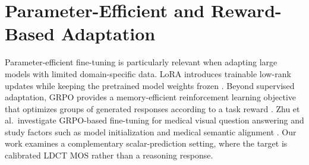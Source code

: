 \section{Parameter-Efficient and Reward-Based Adaptation}
Parameter-efficient fine-tuning is particularly relevant when adapting large models with limited domain-specific data. LoRA introduces trainable low-rank updates while keeping the pretrained model weights frozen \cite{hu2022lora}. Beyond supervised adaptation, GRPO provides a memory-efficient reinforcement learning objective that optimizes groups of generated responses according to a task reward \cite{shao2024deepseekmath}. Zhu et al.\ investigate GRPO-based fine-tuning for medical visual question answering and study factors such as model initialization and medical semantic alignment \cite{zhu2025medicalgrpo}. Our work examines a complementary scalar-prediction setting, where the target is calibrated LDCT MOS rather than a reasoning response.

